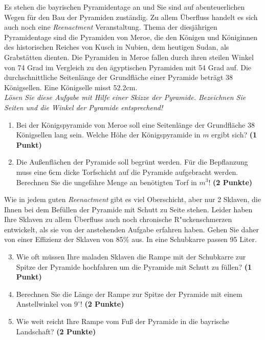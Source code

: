 \documentclass[a4paper, 9pt]{scrartcl}\usepackage[]{graphicx}\usepackage[]{xcolor}
\begin{document}
Es stehen die bayrischen Pyramidentage an und Sie sind auf
abenteuerlichen Wegen f{\"u}r den Bau der Pyramiden zust{\"a}ndig. Zu allem
{\"U}berfluss handelt es sich auch noch eine \textit{Reenactment}
Veranstaltung. Thema der diesj{\"a}hrigen Pyramidentage sind die Pyramiden von
Meroe, die den K{\"o}nigen und K{\"o}niginnen des historischen Reiches von Kusch in
Nubien, dem heutigen Sudan, als Grabst{\"a}tten dienten. Die Pyramiden in Meroe
fallen durch ihren steilen Winkel von 74 Grad im Vergleich zu
den {\"a}gyptischen Pyramiden mit 54 Grad auf. Die durchschnittliche
Seitenl{\"a}nge der Grundfl{\"a}che einer Pyramide betr{\"a}gt 38 K{\"o}nigsellen. Eine K{\"o}nigselle
misst 52.2cm.\\

\textit{L{\"o}sen Sie diese Aufgabe mit Hilfe einer Skizze der Pyramide. Bezeichnen
  Sie Seiten und die Winkel der Pyramide entsprechend!}

\begin{enumerate}
\item Bei der K{\"o}nigspyramide von Meroe soll eine Seitenl{\"a}nge der Grundfl{\"a}che
  38 K{\"o}nigsellen lang sein. Welche H{\"o}he der K{\"o}nigspyramide in $m$
  ergibt sich? \textbf{(1 Punkt)}
\item Die Au{\ss}enfl{\"a}chen der Pyramide soll begr{\"u}nt werden. F{\"u}r die
  Bepflanzung muss eine 6cm dicke Torfschicht auf die
  Pyramide aufgebracht werden. Berechnen Sie die ungef{\"a}hre Menge an
  ben{\"o}tigten Torf in $m^3$! \textbf{(2 Punkte)}
\end{enumerate}

Wie in jedem guten \textit{Reenactment} gibt es viel Oberschicht, aber nur
2 Sklaven, die Ihnen bei dem Bef{\"u}llen der Pyramide mit Schutt
zu Seite stehen. Leider haben Ihre Sklaven zu allem {\"U}berfluss auch noch
chronische R{"u}ckenschmerzen entwickelt, als sie von der
anstehenden Aufgabe erfahren haben. Gehen Sie daher von einer Effizienz der
Sklaven von 85\% aus. In eine Schubkarre passen
95 Liter.

\begin{enumerate}
  \setcounter{enumi}{2}
\item Wie oft m{\"u}ssen Ihre maladen Sklaven die Rampe mit der Schubkarre
  zur Spitze der Pyramide hochfahren um die Pyramide mit Schutt zu f{\"u}llen? \textbf{(1 Punkt)}
\item Berechnen Sie die L{\"a}nge der Rampe zur Spitze der Pyramide mit einem
  Anstellwinkel von $9^\circ$! \textbf{(2 Punkte)}
\item Wie weit reicht Ihre Rampe vom Fu{\ss} der Pyramide in die bayrische
  Landschaft?  \textbf{(2 Punkte)}
\end{enumerate}
\end{document}
